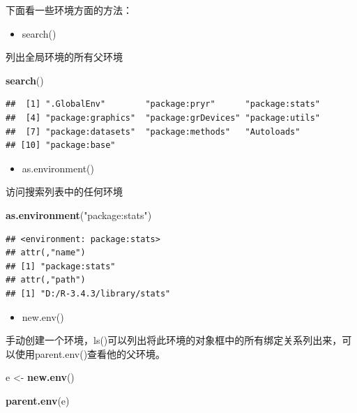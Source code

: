 \documentclass[]{book}
\newenvironment{Shaded}{\begin{snugshade}}{\end{snugshade}}
\newcommand{\KeywordTok}[1]{\textcolor[rgb]{0.13,0.29,0.53}{\textbf{#1}}}
\newcommand{\StringTok}[1]{\textcolor[rgb]{0.31,0.60,0.02}{#1}}
\newcommand{\NormalTok}[1]{#1}
\providecommand{\tightlist}{%
  \setlength{\itemsep}{0pt}\setlength{\parskip}{0pt}}
\begin{document}
下面看一些环境方面的方法：

\begin{itemize}
\tightlist
\item
  search()
\end{itemize}

列出全局环境的所有父环境

\begin{Shaded}
\begin{Highlighting}[]
\KeywordTok{search}\NormalTok{()}
\end{Highlighting}
\end{Shaded}

\begin{verbatim}
##  [1] ".GlobalEnv"        "package:pryr"      "package:stats"    
##  [4] "package:graphics"  "package:grDevices" "package:utils"    
##  [7] "package:datasets"  "package:methods"   "Autoloads"        
## [10] "package:base"
\end{verbatim}

\begin{itemize}
\tightlist
\item
  as.environment()
\end{itemize}

访问搜索列表中的任何环境

\begin{Shaded}
\begin{Highlighting}[]
\KeywordTok{as.environment}\NormalTok{(}\StringTok{"package:stats"}\NormalTok{)}
\end{Highlighting}
\end{Shaded}

\begin{verbatim}
## <environment: package:stats>
## attr(,"name")
## [1] "package:stats"
## attr(,"path")
## [1] "D:/R-3.4.3/library/stats"
\end{verbatim}

\begin{itemize}
\tightlist
\item
  new.env()
\end{itemize}

手动创建一个环境，ls()可以列出将此环境的对象框中的所有绑定关系列出来，可以使用parent.env()查看他的父环境。

\begin{Shaded}
\begin{Highlighting}[]
\NormalTok{e <-}\StringTok{ }\KeywordTok{new.env}\NormalTok{()}

\KeywordTok{parent.env}\NormalTok{(e)}
\end{Highlighting}
\end{Shaded}
\end{document}
